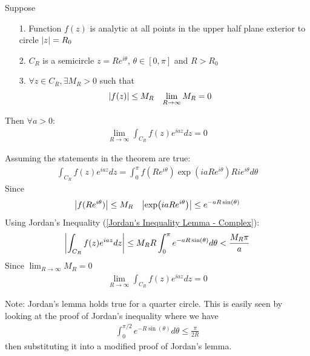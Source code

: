 \documentclass[12pt, english]{book}
\makeatletter
\renewenvironment{proof}[1][\proofname]{\par
	\pushQED{\qed}%
	\normalfont \topsep6\p@\@plus6\p@\relax
	\list{}{%
		\settowidth{\leftmargin}{\itshape\proofname:\hskip\labelsep}%
		\setlength{\labelwidth}{0pt}%
		\setlength{\itemindent}{-\leftmargin}%
	}%
	\item[\hskip\labelsep\itshape#1\@addpunct{:}]\ignorespaces
	}{ \popQED\endlist\@endpefalse}
\makeatother
\begin{document}
	\begin{theorem}
		\label{Jordan's Lemma - Complex}
		Suppose
		\begin{itemize}
			\item[1.] Function \(f(z)\) is analytic at all points in the upper half plane exterior to circle \(\abs{z} = R_0\)
			\item[2.] \(C_R\) is a semicircle \(z = Re^{i\theta}\), \(\theta \in [0,\pi]\) and \(R>R_0\)
			\item[3.] \(\forall z \in C_R, \exists M_R > 0\) such that 
			\begin{align*}
				\abs{f(z)} &\leq M_R	&	 \lim_{R \rightarrow \infty} M_R &= 0
			\end{align*}
		\end{itemize}
		Then \(\forall a > 0\):
		\begin{align*}
			\lim_{R \rightarrow \infty} \int_{C_R} f(z) e^{iaz} dz = 0
		\end{align*}
	\end{theorem}
	\begin{proof}
		Assuming the statements in the theorem are true:
		\begin{align*}
			\int_{C_R} f(z) e^{iaz} dz = \int_{0}^{\pi} f(Re^{i\theta}) \exp(iaRe^{i\theta}) Rie^{i\theta} d\theta
		\end{align*}
		Since 
		\begin{align*}
			\abs{f(Re^{i\theta})} &\leq M_R	& \abs{\exp(iaRe^{i\theta})} \leq e^{-aR\sin(\theta)}
		\end{align*}
		Using Jordan's Inequality (\cref{Jordan's Inequality Lemma - Complex}):
		\begin{align*}
			\abs{\int_{C_R} f(z) e^{iaz} dz} \leq M_R R \int_{0}^{\pi} e^{-aR \sin(\theta)} d\theta < \frac{M_R \pi}{a}
		\end{align*}
		Since \( \lim_{R \rightarrow \infty} M_R = 0\)
		\begin{align*}
			\lim_{R \rightarrow \infty} \int_{C_R} f(z) e^{iaz} dz = 0
		\end{align*}
	\end{proof}

	Note: Jordan's lemma holds true for a quarter circle. This is easily seen by looking at the proof of Jordan's inequality where we have 
	\begin{align*}
		\int_{0}^{\pi/2} e^{-R \sin(\theta)} d\theta \leq \frac{\pi}{2R}
	\end{align*}
	then substituting it into a modified proof of Jordan's lemma.
	
\end{document}
